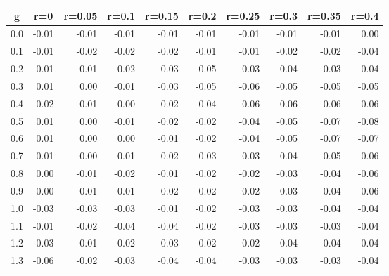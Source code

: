 %
\begin{table}[!tbp]
 \begin{center}
 \begin{tabular}{rrrrrrrrrr}\hline\hline
\multicolumn{1}{c}{g}&\multicolumn{1}{c}{r=0}&\multicolumn{1}{c}{r=0.05}&\multicolumn{1}{c}{r=0.1}&\multicolumn{1}{c}{r=0.15}&\multicolumn{1}{c}{r=0.2}&\multicolumn{1}{c}{r=0.25}&\multicolumn{1}{c}{r=0.3}&\multicolumn{1}{c}{r=0.35}&\multicolumn{1}{c}{r=0.4}\tabularnewline
\hline
0.0&-0.01&-0.01&-0.01&-0.01&-0.01&-0.01&-0.01&-0.01& 0.00\tabularnewline
0.1&-0.01&-0.02&-0.02&-0.02&-0.01&-0.01&-0.02&-0.02&-0.04\tabularnewline
0.2& 0.01&-0.01&-0.02&-0.03&-0.05&-0.03&-0.04&-0.03&-0.04\tabularnewline
0.3& 0.01& 0.00&-0.01&-0.03&-0.05&-0.06&-0.05&-0.05&-0.05\tabularnewline
0.4& 0.02& 0.01& 0.00&-0.02&-0.04&-0.06&-0.06&-0.06&-0.06\tabularnewline
0.5& 0.01& 0.00&-0.01&-0.02&-0.02&-0.04&-0.05&-0.07&-0.08\tabularnewline
0.6& 0.01& 0.00& 0.00&-0.01&-0.02&-0.04&-0.05&-0.07&-0.07\tabularnewline
0.7& 0.01& 0.00&-0.01&-0.02&-0.03&-0.03&-0.04&-0.05&-0.06\tabularnewline
0.8& 0.00&-0.01&-0.02&-0.01&-0.02&-0.02&-0.03&-0.04&-0.06\tabularnewline
0.9& 0.00&-0.01&-0.01&-0.02&-0.02&-0.02&-0.03&-0.04&-0.06\tabularnewline
1.0&-0.03&-0.03&-0.03&-0.01&-0.02&-0.03&-0.03&-0.04&-0.04\tabularnewline
1.1&-0.01&-0.02&-0.04&-0.04&-0.02&-0.03&-0.03&-0.03&-0.04\tabularnewline
1.2&-0.03&-0.01&-0.02&-0.03&-0.02&-0.02&-0.04&-0.04&-0.04\tabularnewline
1.3&-0.06&-0.02&-0.03&-0.04&-0.04&-0.03&-0.03&-0.03&-0.04\tabularnewline
\hline
\end{tabular}

\end{center}

\end{table}


